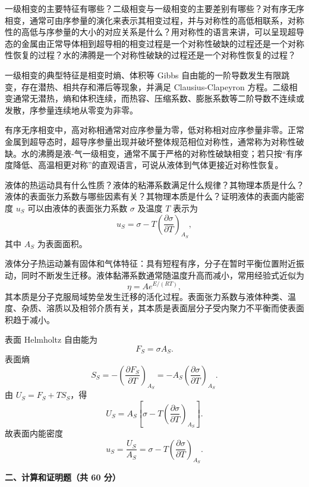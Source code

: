 \begin{question}
一级相变的主要特征有哪些？二级相变与一级相变的主要差别有哪些？对有序无序相变，通常可由序参量的演化来表示其相变过程，并与对称性的高低相联系，对称性的高低与序参量的大小的对应关系是什么？用对称性的语言来讲，可以呈现超导态的金属由正常导体相到超导相的相变过程是一个对称性破缺的过程还是一个对称性恢复的过程？水的沸腾是一个对称性破缺的过程还是一个对称性恢复的过程？
\begin{solution}
一级相变的典型特征是相变时熵、体积等 Gibbs 自由能的一阶导数发生有限跳变，存在潜热、相共存和滞后等现象，并满足 Clausius-Clapeyron 方程。二级相变通常无潜热，熵和体积连续，而热容、压缩系数、膨胀系数等二阶导数不连续或发散，序参量连续地从零变为非零。

有序无序相变中，高对称相通常对应序参量为零，低对称相对应序参量非零。正常金属到超导态时，超导序参量出现并破坏整体规范相位对称性，通常称为对称性破缺。水的沸腾是液-气一级相变，通常不属于严格的对称性破缺相变；若只按“有序度降低、高温相更对称”的直观语言，可说从液体到气体更接近对称性恢复。
\end{solution}
\end{question}

\begin{question}
液体的热运动具有什么性质？液体的粘滞系数满足什么规律？其物理本质是什么？液体的表面张力系数与哪些因素有关？其物理本质是什么？证明液体的表面内能密度 $u_S$ 可以由液体的表面张力系数 $\sigma$ 及温度 $T$ 表示为
\[
u_S=\sigma-T\left(\frac{\partial\sigma}{\partial T}\right)_{A_S},
\]
其中 $A_S$ 为表面面积。
\begin{solution}
液体分子热运动兼有固体和气体特征：具有短程有序，分子在暂时平衡位置附近振动，同时不断发生迁移。液体黏滞系数通常随温度升高而减小，常用经验式近似为
\[
\eta=Ae^{E/(RT)},
\]
其本质是分子克服局域势垒发生迁移的活化过程。表面张力系数与液体种类、温度、杂质、溶质以及相邻介质有关，其本质是表面层分子受内聚力不平衡而使表面积趋于减小。

表面 Helmholtz 自由能为
\[
F_S=\sigma A_S.
\]
表面熵
\[
S_S=-\left(\frac{\partial F_S}{\partial T}\right)_{A_S}
=-A_S\left(\frac{\partial\sigma}{\partial T}\right)_{A_S}.
\]
由 $U_S=F_S+TS_S$，得
\[
U_S=A_S\left[\sigma-T\left(\frac{\partial\sigma}{\partial T}\right)_{A_S}\right].
\]
故表面内能密度
\[
u_S=\frac{U_S}{A_S}=\sigma-T\left(\frac{\partial\sigma}{\partial T}\right)_{A_S}.
\]
\end{solution}
\end{question}

\textbf{二、计算和证明题（共 60 分）}


